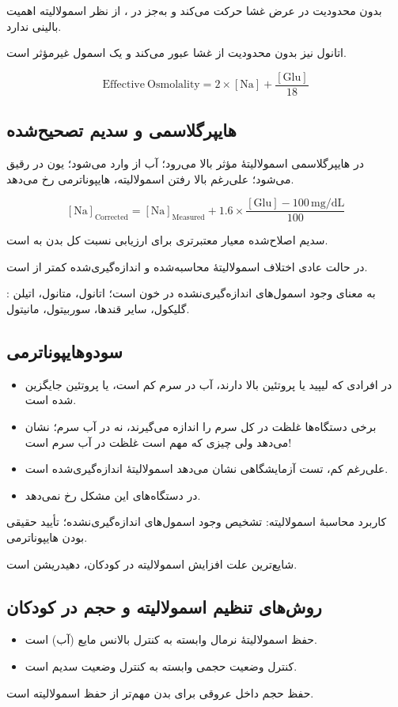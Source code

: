 \documentclass[12pt,a4paper]{article}
\begin{document}
 بدون محدودیت در عرض غشا حرکت می‌کند و به‌جز در ، از نظر اسمولالیته اهمیت بالینی ندارد.

اتانول نیز بدون محدودیت از غشا عبور می‌کند و یک اسمول غیرمؤثر است.
\begin{latin}
\[
\mathrm{Effective\ Osmolality}=2\times[\mathrm{Na}]+\frac{[\mathrm{Glu}]}{18}
\]
\end{latin}

\subsection*{هایپرگلاسمی و سدیم تصحیح‌شده}
در هایپرگلاسمی اسمولالیتهٔ مؤثر  بالا می‌رود؛ آب از  وارد  می‌شود؛ یون  در  رقیق می‌شود؛ علی‌رغم بالا رفتن اسمولالیته، هایپوناترمی رخ می‌دهد.
\begin{latin}
\[
[\mathrm{Na}]_{\mathrm{Corrected}}=[\mathrm{Na}]_{\mathrm{Measured}}+
1.6\times\frac{[\mathrm{Glu}]-100\,\mathrm{mg/dL}}{100}
\]
\end{latin}
سدیم اصلاح‌شده معیار معتبرتری برای ارزیابی نسبت  کل بدن به  است.

در حالت عادی اختلاف اسمولالیتهٔ محاسبه‌شده و اندازه‌گیری‌شده کمتر از  است.

: به معنای وجود اسمول‌های اندازه‌گیری‌نشده در خون است؛ اتانول، متانول، اتیلن گلیکول، سایر قندها، سوربیتول، مانیتول.

\subsection*{سودوهایپوناترمی}
\begin{itemize}
\item در افرادی که لیپید یا پروتئین بالا دارند، آب در سرم کم است، یا پروتئین جایگزین شده است.
\item برخی دستگاه‌ها غلظت  در کل سرم را اندازه می‌گیرند، نه در آب سرم؛ نشان می‌دهد ولی چیزی که مهم است غلظت  در آب سرم است!
\item علی‌رغم  کم، تست آزمایشگاهی نشان می‌دهد اسمولالیتهٔ اندازه‌گیری‌شده  است.
\item در دستگاه‌های  این مشکل رخ نمی‌دهد.
\end{itemize}
کاربرد محاسبهٔ اسمولالیته: تشخیص وجود اسمول‌های اندازه‌گیری‌نشده؛ تأیید حقیقی بودن هایپوناترمی.

شایع‌ترین علت افزایش اسمولالیته در کودکان، دهیدریشن است.

\subsection*{روش‌های تنظیم اسمولالیته و حجم در کودکان}
\begin{itemize}
\item حفظ اسمولالیتهٔ نرمال وابسته به کنترل بالانس مایع (آب) است.
\item کنترل وضعیت حجمی وابسته به کنترل وضعیت سدیم است.
\end{itemize}
حفظ حجم داخل عروقی برای بدن مهم‌تر از حفظ اسمولالیته است.
\end{document}
